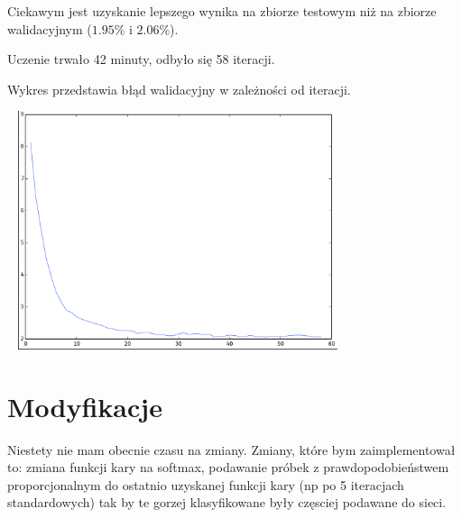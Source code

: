 \documentclass[fleqn]{article}
\begin{document}
Ciekawym jest uzyskanie lepszego wynika na zbiorze testowym niż na zbiorze walidacyjnym ($1.95\%$ i $2.06\%$).

Uczenie trwało 42 minuty, odbyło się 58 iteracji.

Wykres przedstawia błąd walidacyjny w zależności od iteracji.

\includegraphics[width=10cm, height=7cm]{figure1.pdf}


\section{Modyfikacje}
Niestety nie mam obecnie czasu na zmiany.
Zmiany, które bym zaimplementował to: zmiana funkcji kary na softmax, podawanie próbek z prawdopodobieństwem proporcjonalnym do ostatnio uzyskanej funkcji kary (np po 5 iteracjach standardowych) tak by te gorzej klasyfikowane były częsciej podawane do sieci.
\end{document}
